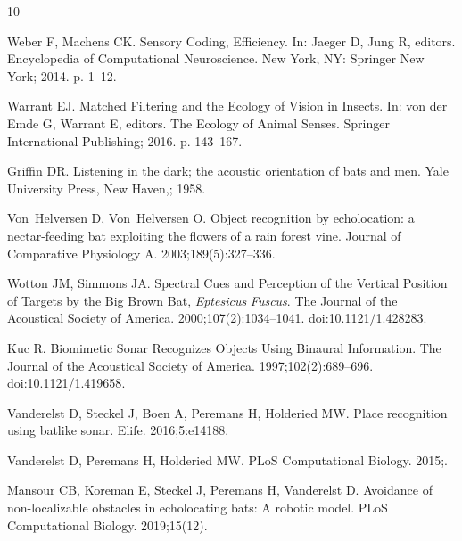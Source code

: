 \documentclass[10pt,letterpaper]{article}
\begin{document}
\begin{thebibliography}{10}
	
	Weber F, Machens CK.
	\newblock Sensory {{Coding}}, {{Efficiency}}.
	\newblock In: Jaeger D, Jung R, editors. Encyclopedia of {{Computational
			Neuroscience}}. {New York, NY}: {Springer New York}; 2014. p. 1--12.
	
	Warrant EJ.
	\newblock Matched {{Filtering}} and the {{Ecology}} of {{Vision}} in
	{{Insects}}.
	\newblock In: {von der Emde} G, Warrant E, editors. The {{Ecology}} of {{Animal
			Senses}}. {Springer International Publishing}; 2016. p. 143--167.
	
	Griffin DR.
	\newblock Listening in the dark; the acoustic orientation of bats and men.
	\newblock Yale University Press, New Haven,; 1958.
	
	Von~Helversen D, Von~Helversen O.
	\newblock Object recognition by echolocation: a nectar-feeding bat exploiting
	the flowers of a rain forest vine.
	\newblock Journal of Comparative Physiology A. 2003;189(5):327--336.
	
	Wotton JM, Simmons JA.
	\newblock Spectral Cues and Perception of the Vertical Position of Targets by
	the Big Brown Bat, {{{\emph{Eptesicus}}}}{\emph{ Fuscus}}.
	\newblock The Journal of the Acoustical Society of America.
	2000;107(2):1034--1041.
	\newblock doi:{10.1121/1.428283}.
	
	Kuc R.
	\newblock Biomimetic Sonar Recognizes Objects Using Binaural Information.
	\newblock The Journal of the Acoustical Society of America.
	1997;102(2):689--696.
	\newblock doi:{10.1121/1.419658}.
	
	Vanderelst D, Steckel J, Boen A, Peremans H, Holderied MW.
	\newblock Place recognition using batlike sonar.
	\newblock Elife. 2016;5:e14188.
	
	Vanderelst D, Peremans H, Holderied MW.
	\newblock %
	\newblock PLoS Computational Biology. 2015;.
	
	Mansour CB, Koreman E, Steckel J, Peremans H, Vanderelst D.
	\newblock Avoidance of non-localizable obstacles in echolocating bats: A
	robotic model.
	\newblock PLoS Computational Biology. 2019;15(12).
	

\end{thebibliography}
\end{document}
